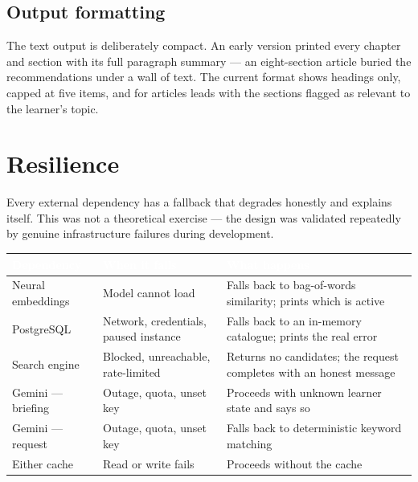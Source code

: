 \documentclass[11pt,a4paper]{article}
\newcommand{\thead}[1]{\textcolor{white}{\bfseries\small #1}}
\newcommand{\headrow}{\rowcolor{navy}}
\begin{document}
\subsection{Output formatting}

The text output is deliberately compact. An early version printed every
chapter and section with its full paragraph summary --- an eight-section
article buried the recommendations under a wall of text. The current format
shows headings only, capped at five items, and for articles leads with the
sections flagged as relevant to the learner's topic.

\newpage
\section{Resilience}

Every external dependency has a fallback that degrades honestly and explains
itself. This was not a theoretical exercise --- the design was validated
repeatedly by genuine infrastructure failures during development.

\vspace{4pt}
\begin{tabularx}{\textwidth}{>{\raggedright\arraybackslash}p{3.4cm} >{\raggedright\arraybackslash}p{4.4cm} >{\raggedright\arraybackslash}X}
\headrow \thead{Dependency} & \thead{When it fails} & \thead{What happens} \\
\midrule
Neural embeddings & Model cannot load & Falls back to bag-of-words similarity; prints which is active \\
\rowcolor{altshade} PostgreSQL & Network, credentials, paused instance & Falls back to an in-memory catalogue; prints the real error \\
Search engine & Blocked, unreachable, rate-limited & Returns no candidates; the request completes with an honest message \\
\rowcolor{altshade} Gemini --- briefing & Outage, quota, unset key & Proceeds with unknown learner state and says so \\
Gemini --- request & Outage, quota, unset key & Falls back to deterministic keyword matching \\
\rowcolor{altshade} Either cache & Read or write fails & Proceeds without the cache \\
\bottomrule
\end{tabularx}
\vspace{8pt}
\end{document}
